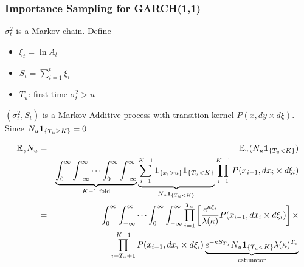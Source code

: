 \documentclass{beamer}
\begin{document}
\begin{frame}
  \frametitle{Importance Sampling for GARCH(1,1)}
  $\sigma_{t}^2$ is a Markov chain. Define
  \begin{itemize}
  \item $\xi_t = \ln A_t$
  \item $S_t = \sum_{i=1}^{t} \xi_i$
  \item $T_u$: first time $\sigma_t^2 > u$
  \end{itemize}
  $(\sigma_t^2, S_t)$ is a Markov Additive process with
  transition kernel $P(x, dy \times d\xi)$. Since $N_u \mathbf{1}_{\{T_u \geq
    K\}} = 0$
  \begin{footnotesize}
    \begin{eqnarray*}
      \mathbb{E}_\gamma N_u &=& \mathbb{E}_\gamma(N_u\mathbf{1}_{\{T_u < K\}}) \\
                    &=& \underbrace{
                        \int_0^\infty \int_{-\infty}^\infty
                        \cdots
                        \int_0^\infty \int_{-\infty}^\infty
                        }_{K-1 \text{ fold}}
                        \underbrace{
                        \sum_{i=1}^{K-1} \mathbf{1}_{\{x_i > u\}} \mathbf{1}_{\{T_u < K\}}
                        }_{N_u \mathbf{1}_{\{T_u < K\}}}
                        \prod_{i=1}^{K-1} P(x_{i-1}, d x_{i} \times
                        d\xi_{i}) \\
      &=&
          \int_0^\infty \int_{-\infty}^\infty
          \cdots
          \int_0^\infty \int_{-\infty}^\infty
          \prod_{i=1}^{T_u} \left[
          {e^{\kappa \xi_i} \over \lambda(\kappa)}
          P(x_{i-1}, d x_{i} \times d\xi_{i})
          \right] \times \\
      && \prod_{i=T_u + 1}^{K-1} P(x_{i-1}, dx_{i} \times d\xi_i)
         \underbrace{
         e^{-\kappa S_{T_u}} N_u\mathbf{1}_{\{T_u < K\}} \lambda(\kappa)^{T_u}
         }_{\text{estimator}}
    \end{eqnarray*}
  \end{footnotesize}
\end{frame}
\end{document}
